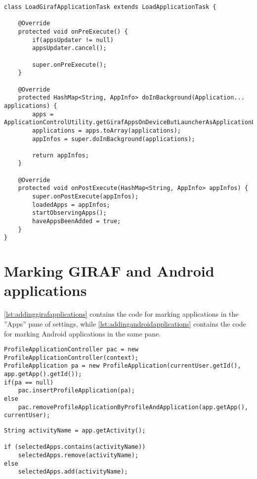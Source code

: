   \begin{lstlisting}[caption={The LoadGirafApplicationTask, derived from LoadApplicationTask. This is the derived class used by GirafFragment to load applications into view. Please note that all comments and the constructor have been removed to make the listing smaller}, label={lst:derivedlat}]
class LoadGirafApplicationTask extends LoadApplicationTask {
	
	@Override
	protected void onPreExecute() {
		if(appsUpdater != null)
		appsUpdater.cancel();
		
		super.onPreExecute();
	}
	
	@Override
	protected HashMap<String, AppInfo> doInBackground(Application... applications) {
		apps = ApplicationControlUtility.getGirafAppsOnDeviceButLauncherAsApplicationList(context);
		applications = apps.toArray(applications);
		appInfos = super.doInBackground(applications);
		
		return appInfos;
	}
	
	@Override
	protected void onPostExecute(HashMap<String, AppInfo> appInfos) {
		super.onPostExecute(appInfos);
		loadedApps = appInfos;
		startObservingApps();
		haveAppsBeenAdded = true;
	}
}
\end{lstlisting}

\section{Marking GIRAF and Android applications}\label{appendix:markingapps}

\cref{lst:addinggirafapplications} contains the code for marking \giraf applications in the ''Apps'' pane of settings, while \cref{lst:addingandroidapplications} contains the code for marking Android applications in the same pane.

\begin{lstlisting}[caption={The methods used for adding or removing a Giraf application to a user}, label={lst:addinggirafapplications}]
ProfileApplicationController pac = new ProfileApplicationController(context);
ProfileApplication pa = new ProfileApplication(currentUser.getId(), app.getApp().getId());
if(pa == null)
	pac.insertProfileApplication(pa);
else
	pac.removeProfileApplicationByProfileAndApplication(app.getApp(), currentUser);
\end{lstlisting}

\begin{lstlisting}[caption={The methods used for adding or removing an Android application to a user. Please note that the documentation has been removed.}, label={lst:addingandroidapplications}]
String activityName = app.getActivity();

if (selectedApps.contains(activityName))
    selectedApps.remove(activityName);
else
    selectedApps.add(activityName);
\end{lstlisting}